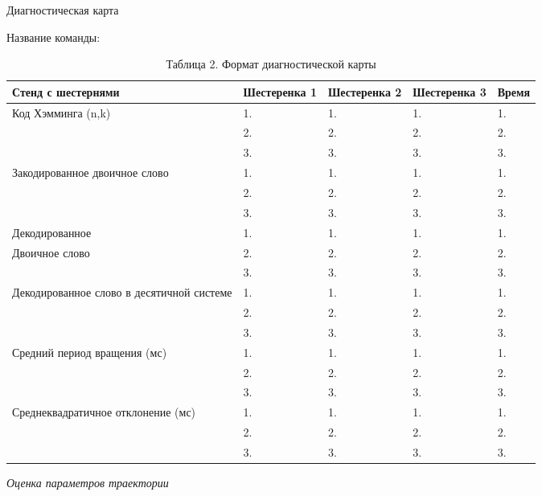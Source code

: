 \begin{table}[H]
    \center
    \caption{Таблица 2. Формат диагностической карты}
    Диагностическая карта

    Название команды: \underline{\hspace{3cm}}
    \begin{tabular}{|p{4cm}|l|l|l|l|}
        \hline
        Стенд с шестернями & Шестеренка 1	&Шестеренка 2&	Шестеренка 3&	Время \\
        \hline
        Код Хэмминга (n,k)	& 1. & 1. & 1. & 1. \\
        & 2. & 2. & 2. & 2. \\
        & 3. & 3. & 3. & 3. \\
        \hline
        Закодированное двоичное слово & 1. & 1. & 1. & 1. \\
        & 2. & 2. & 2. & 2. \\
        & 3. & 3. & 3. & 3. \\
        \hline
        Декодированное & 1. & 1. & 1. & 1. \\
        Двоичное слово & 2. & 2. & 2. & 2. \\
        & 3. & 3. & 3. & 3. \\
        \hline       
        Декодированное слово в десятичной системе 	& 1. & 1. & 1. & 1. \\
        & 2. & 2. & 2. & 2. \\
        & 3. & 3. & 3. & 3. \\
        \hline
        Средний период вращения (мс) & 1. & 1. & 1. & 1. \\
        & 2. & 2. & 2. & 2. \\
        & 3. & 3. & 3. & 3. \\
        \hline 
        Среднеквадратичное отклонение (мс) & 1. & 1. & 1. & 1. \\
        & 2. & 2. & 2. & 2. \\
        & 3. & 3. & 3. & 3. \\
        \hline
    \end{tabular}
\end{table}

\textit{Оценка параметров траектории}

